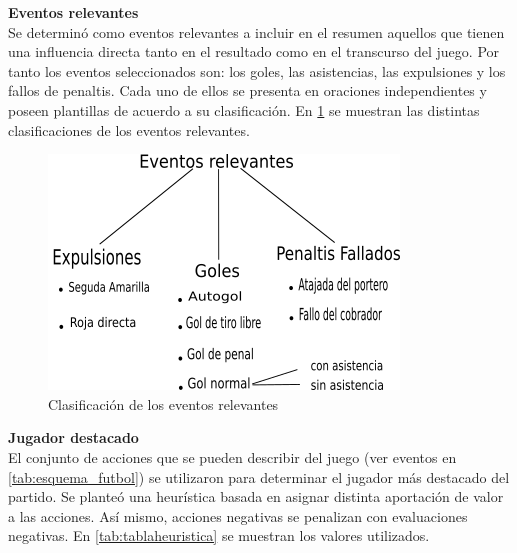     \textbf{Eventos relevantes}\\

    Se determinó como eventos relevantes a incluir en el resumen aquellos que tienen una influencia directa 
tanto en el resultado como en el transcurso del juego. Por tanto los eventos seleccionados son: los goles, las asistencias, 
las expulsiones y los fallos de penaltis. Cada uno de ellos se presenta en oraciones independientes y poseen plantillas de acuerdo 
a su clasificación. En \ref{fig_clasificacioneventos} se muestran las distintas clasificaciones de los eventos relevantes.\\


    \begin{figure}[!]
        \begin{center}
            \includegraphics[scale=0.9]{Graphics/clasificacioneventosrel.png}
        \end{center}
        \caption{Clasificación de los eventos relevantes}
        \label{fig_clasificacioneventos}
    \end{figure}

    \textbf{Jugador destacado}\\

    El conjunto de acciones que se pueden describir del juego (ver eventos en \ref{tab:esquema_futbol}) se utilizaron para 
determinar el jugador más destacado del partido. Se planteó una heurística basada en asignar distinta aportación de valor a 
las acciones. Así mismo, acciones negativas se penalizan con evaluaciones negativas. En \ref{tab:tablaheuristica} se muestran los valores utilizados.



